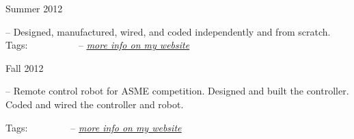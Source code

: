 
\flushleft \begin{minipage}[t]{\dateColWidth}
Summer 2012
\end{minipage}
\begin{minipage}[t]{0.8\textwidth}
	--
	Designed, manufactured, wired, and coded independently and from scratch.
	\\[0.2 em]
	Tags: 
	 \vline\ 
	 \vline\ 
	 \vline\ 
	 \vline\ 
	 \vline\ 
	 \vline\ 
	--
	\href{http://www.claytonketner.com/robotic-arm-mk2/}{\uline{\textit{more info on my website}}}
\end{minipage}

\divLine

\flushleft \begin{minipage}[t]{\dateColWidth}
Fall 2012
\end{minipage}
\begin{minipage}[t]{0.8\textwidth}
	--
	Remote control robot for ASME competition. Designed and built the controller. Coded and wired the controller and robot.

	Tags:
	\tag{CAD} \vline\ 
	 \vline\ 
	 \vline\ 
	 \vline\ 
	 \vline\ 
	--
	\href{http://www.claytonketner.com/senior-project-robot/}{\uline{\textit{more info on my website}}}
\end{minipage}
